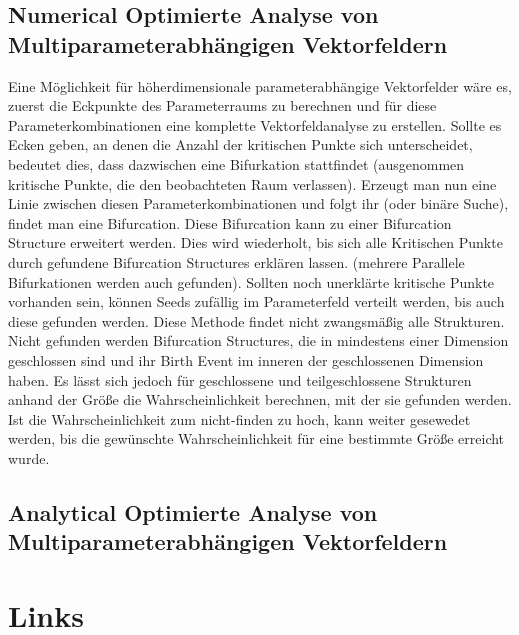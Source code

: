 \documentclass[11pt]{article}
\begin{document}
\subsection{Numerical Optimierte Analyse von Multiparameterabhängigen Vektorfeldern}
Eine Möglichkeit für höherdimensionale parameterabhängige Vektorfelder wäre es, zuerst die Eckpunkte des Parameterraums zu berechnen und für diese Parameterkombinationen eine komplette Vektorfeldanalyse zu erstellen.
Sollte es Ecken geben, an denen die Anzahl der kritischen Punkte sich unterscheidet, bedeutet dies, dass dazwischen eine Bifurkation stattfindet (ausgenommen kritische Punkte, die den beobachteten Raum verlassen). Erzeugt man nun eine Linie zwischen diesen Parameterkombinationen und folgt ihr (oder binäre Suche), findet man eine Bifurcation. Diese Bifurcation kann zu einer Bifurcation Structure erweitert werden. Dies wird wiederholt, bis sich alle Kritischen Punkte durch gefundene Bifurcation Structures erklären lassen. (mehrere Parallele Bifurkationen werden auch gefunden). Sollten noch unerklärte kritische Punkte vorhanden sein, können Seeds zufällig im Parameterfeld verteilt werden, bis auch diese gefunden werden.
Diese Methode findet nicht zwangsmäßig alle Strukturen. Nicht gefunden werden Bifurcation Structures, die in mindestens einer Dimension geschlossen sind und ihr Birth Event im inneren der geschlossenen Dimension haben. Es lässt sich jedoch für geschlossene und teilgeschlossene Strukturen anhand der Größe die Wahrscheinlichkeit berechnen, mit der sie gefunden werden. Ist die Wahrscheinlichkeit zum nicht-finden zu hoch, kann weiter gesewedet werden, bis die gewünschte Wahrscheinlichkeit für eine bestimmte Größe erreicht wurde. 


\subsection{Analytical Optimierte Analyse von Multiparameterabhängigen Vektorfeldern}





\pagebreak
\section{Links}


\end{document}
